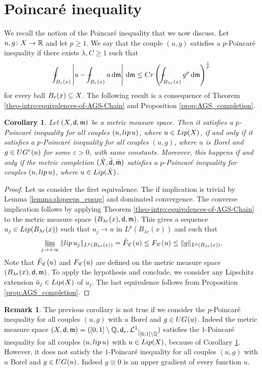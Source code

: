 \documentclass[12pt]{amsart}
\newcommand{\R}{\mathbb{R}}
\newcommand{\sfd}{{\sf d}}
\renewcommand{\d}{{\mathrm d}}
\newcommand{\restr}[1]{\lower3pt\hbox{$|_{#1}$}}
\newcommand{\limi}{\varliminf}
\newcommand{\X}{{\rm X}}
\newcommand{\lip}{{\rm lip}}
\newcommand{\Lip}{{\rm Lip}}
\newcommand{\mm}{\mathfrak m}
\newcommand{\F}{{\rm F}}
\def\Xint#1{\mathchoice
{\XXint\displaystyle\textstyle{#1}}%
{\XXint\textstyle\scriptstyle{#1}}%
{\XXint\scriptstyle\scriptscriptstyle{#1}}%
{\XXint\scriptscriptstyle\scriptscriptstyle{#1}}%
\!\int}
\def\XXint#1#2#3{{\setbox0=\hbox{$#1{#2#3}{\int}$ }
\vcenter{\hbox{$#2#3$ }}\kern-.6\wd0}}
\def\dashint{\Xint-}
\newtheorem{corollary}[theorem]{Corollary}
\theoremstyle{definition}
\newtheorem{remark}[theorem]{Remark}
\newcommand{\Chain}[1]{\mathscr{C}^{#1}}
\newcommand{\UG}[1]{{\rm UG}^{#1}}
\renewcommand{\F}[1]{{\rm F}_{{\rm #1}}}
\newcommand{\relF}[1]{\tilde{\rm F}_{{\rm #1}}}
\begin{document}
\section{Poincar\'{e} inequality}
\label{sec:PI}
%
We recall the notion of the Poincaré inequality that we now discuss. Let $u,g\colon \X \to \R$ and let $p \ge 1$. We say that the couple $(u,g)$ satisfies a $p$-Poincaré inequality if there exists $\lambda, C \geq 1$ such that
\begin{equation}
    \label{eq:PI-u-g-integral}
    \dashint_{B_{r}(x)} \left\vert u - \dashint_{B_r(x)}u\,\d\mm\right\vert \,\d \mm \leq Cr\left(\dashint_{B_{\lambda r}(x)} g^p\,\d\mm\right)^{\frac{1}{p}}
\end{equation}
for every ball $B_r(x)\subseteq \X$. The following result is a consequence of Theorem \ref{theo-intro:equivalences-of-AGS-Chain} and Proposition \ref{prop:AGS_completion}.
%
\begin{corollary}
\label{cor:PI_lip=chain}
    Let $(\X,\sfd,\mm)$ be a metric measure space. Then it satisfies a $p$-Poincaré inequality for all couples $(u,\lip\,u)$, where $u\in \Lip(\X)$, if and only if it satisfies a $p$-Poincaré inequality for all couples $(u,g)$, where $u$ is Borel and $g\in \UG{\varepsilon}(u)$ for some $\varepsilon > 0$, with same constants. Moreover, this happens if and only if the metric completion $(\bar{\X},\bar{\sfd},\bar{\mm})$ satisfies a $p$-Poincaré inequality for couples $(u,\lip\,u)$, where $u\in \Lip(\bar{\X})$.
\end{corollary}
\begin{proof}

    Let us consider the first equivalence. The if implication is trivial by Lemma \ref{lemma:slopeeps_epsug} and dominated convergence. The converse implication follows by applying Theorem \ref{theo-intro:equivalences-of-AGS-Chain} to the metric measure space $(B_{\lambda r}(x), \sfd,\mm)$. This gives a sequence $u_j \in {\rm Lip}(B_{\lambda r}(x))$ such that $u_j \to u$ in $L^p(B_{\lambda r}(x))$ and such that 
    $$\limi_{j\to +\infty} \| \lip\, u_j\|_{L^p(B_{\lambda r}(x))} =  \relF{\Chain{}}(u) \le \F{\Chain{}}(u) \le \| g\|_{L^p(B_{\lambda r}(x))}.$$
    Note that $\relF{\Chain{}}(u)$ and $\F{\Chain{}}(u)$ are defined on the metric measure space $(B_{\lambda r}(x), \sfd,\mm)$.
    To apply the hypothesis and conclude, we consider any Lipschitz extension $\tilde{u}_j \in \Lip(\X)$ of $u_j$. The last equivalence follows from Proposition \ref{prop:AGS_completion}.
\end{proof}
%
\begin{remark}
\label{rem:example_not_equivalence_poincare}
    The previous corollary is not true if we consider the $p$-Poincaré inequality for all couples $(u,g)$ with $u$ Borel and $g\in \UG{}(u)$.
    Indeed the metric measure space $(\X,\sfd,\mm) = ([0,1]\setminus \mathbb{Q},\sfd_e, \mathcal{L}^1 \restr{[0,1]\setminus \mathbb{Q}})$ satisfies the $1$-Poincaré inequality for all couples $(u,\lip\,u)$ with $u\in \Lip(\X)$, because of Corollary \ref{cor:PI_lip=chain}. However, it does not satisfy the $1$-Poincaré inequality for all couples $(u,g)$ with $u$ Borel and $g\in \UG{}(u)$. Indeed $g \equiv 0$ is an upper gradient of every function $u$.
\end{remark}
\end{document}
